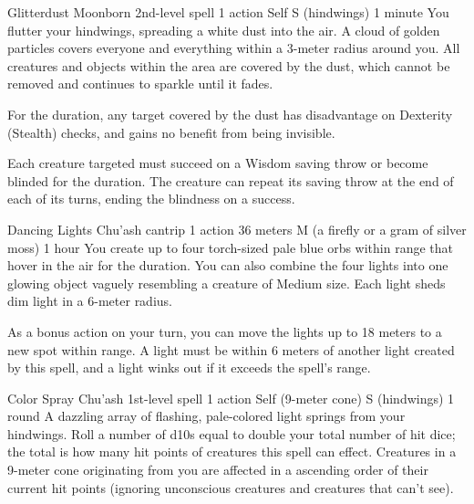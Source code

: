 \DndSpellHeader %
    {Glitterdust \label{spell::glitterdust}}
    {Moonborn 2nd-level spell}
    {1 action}
    {Self}
    {S (hindwings)}
    {1 minute}
You flutter your hindwings, spreading a white dust into the air.
A cloud of golden particles covers everyone and everything within a 3-meter radius around you.
All creatures and objects within the area are covered by the dust, which cannot be removed and continues to sparkle until it fades.

For the duration, any target covered by the dust has disadvantage on Dexterity (Stealth) checks, and gains no benefit from being invisible.

Each creature targeted must succeed on a Wisdom saving throw or become blinded for the duration.
The creature can repeat its saving throw at the end of each of its turns, ending the blindness on a success.

\DndSpellHeader %
    {Dancing Lights \label{spell::dancinglights}}
    {Chu'ash cantrip}
    {1 action}
    {36 meters}
    {M (a firefly or a gram of silver moss)}
    {1 hour}
You create up to four torch-sized pale blue orbs within range that hover in the air for the duration.
You can also combine the four lights into one glowing object vaguely resembling a creature of Medium size.
Each light sheds dim light in a 6-meter radius.

As a bonus action on your turn, you can move the lights up to 18 meters to a new spot within range.
A light must be within 6 meters of another light created by this spell, and a light winks out if it exceeds the spell's range.

\DndSpellHeader %
    {Color Spray \label{spell::colorspray}}
    {Chu'ash 1st-level spell}
    {1 action}
    {Self (9-meter cone)}
    {S (hindwings)}
    {1 round}
A dazzling array of flashing, pale-colored light springs from your hindwings.
Roll a number of d10s equal to double your total number of hit dice; the total is how many hit points of creatures this spell can effect.
Creatures in a 9-meter cone originating from you are affected in a ascending order of their current hit points (ignoring unconscious creatures and creatures that can't see).

